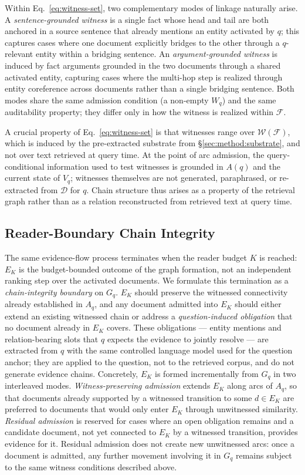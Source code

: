 Within Eq.~\eqref{eq:witness-set}, two complementary modes of linkage
naturally arise. A \emph{sentence-grounded witness} is a single fact whose
head and tail are both anchored in a source sentence that already mentions
an entity activated by $q$; this captures cases where one document
explicitly bridges to the other through a $q$-relevant entity within a
bridging sentence. An \emph{argument-grounded witness} is induced by fact
arguments grounded in the two documents through a shared activated
entity, capturing cases where the multi-hop step is realized through
entity coreference across documents rather than a single bridging
sentence. Both modes share the same admission condition (a non-empty
$W_q$) and the same auditability property; they differ only in how the
witness is realized within $\mathcal{F}$.

A crucial property of Eq.~\eqref{eq:witness-set} is that witnesses range
over $\mathcal{W}(\mathcal{F})$, which is induced by the pre-extracted
substrate from \S\ref{sec:method:substrate}, and not over text retrieved
at query time. At the point of arc admission, the query-conditional
information used to test witnesses is grounded in $A(q)$ and the current
state of $V_q$; witnesses themselves are not generated, paraphrased, or
re-extracted from $\mathcal{D}$ for $q$. Chain structure thus arises as a
property of the retrieval graph rather than as a relation reconstructed
from retrieved text at query time.

\subsection{Reader-Boundary Chain Integrity}
\label{sec:method:boundary}
The same evidence-flow process terminates when the reader budget $K$ is
reached: $E_K$ is the budget-bounded outcome of the graph formation, not
an independent ranking step over the activated documents. We formulate
this termination as a \emph{chain-integrity boundary} on $G_q$. $E_K$
should preserve the witnessed connectivity already established in $A_q$,
and any document admitted into $E_K$ should either extend an existing
witnessed chain or address a \emph{question-induced obligation} that no
document already in $E_K$ covers. These obligations --- entity mentions
and relation-bearing slots that $q$ expects the evidence to jointly
resolve --- are extracted from $q$ with the same controlled language model
used for the question anchor; they are applied to the question, not to
the retrieved corpus, and do not generate evidence chains. Concretely,
$E_K$ is formed incrementally from $G_q$ in two interleaved modes.
\emph{Witness-preserving admission} extends $E_K$ along arcs of $A_q$, so
that documents already supported by a witnessed transition to some
$d \in E_K$ are preferred to documents that would only enter $E_K$
through unwitnessed similarity. \emph{Residual admission} is reserved for
cases where an open obligation remains and a candidate document, not yet
connected to $E_K$ by a witnessed transition, provides evidence for it.
Residual admission does not create new unwitnessed arcs: once a document
is admitted, any further movement involving it in $G_q$ remains subject
to the same witness conditions described above.
